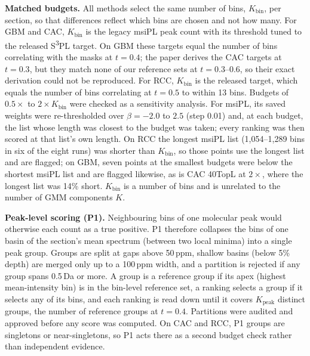 \textbf{Matched budgets.} All methods select the same number of bins,
$K_{\text{bin}}$, per section, so that differences reflect which bins are
chosen and not how many. For GBM and CAC, $K_{\text{bin}}$ is the legacy msiPL peak count with its
threshold tuned to the released S\textsuperscript{3}PL target. On GBM these
targets equal the number of bins correlating with the masks at $t=0.4$; the
paper derives the CAC targets at $t=0.3$, but they match none of our reference
sets at $t=0.3$--$0.6$, so their exact derivation could not be reproduced.
For RCC, $K_{\text{bin}}$ is the released target, which equals the number of
bins correlating at $t=0.5$ to within 13 bins. Budgets of $0.5\times$ to $2\times K_{\text{bin}}$ were checked as a
sensitivity analysis. For msiPL, its saved weights were re-thresholded over
$\beta=-2.0$ to $2.5$ (step 0.01) and, at each budget, the list whose length was
closest to the budget was taken; every ranking was then scored at that list's
own length. On RCC the longest msiPL list (1{,}054--1{,}289 bins in six of the
eight runs) was shorter than $K_{\text{bin}}$, so those points use the longest
list and are flagged; on GBM, seven points at the smallest budgets were below
the shortest msiPL list and are flagged likewise, as is CAC 40TopL at $2\times$, where the longest
list was 14\% short. $K_{\text{bin}}$ is a number
of bins and is unrelated to the number of GMM components $K$.

\textbf{Peak-level scoring (P1).} Neighbouring bins of one molecular peak would
otherwise each count as a true positive. P1 therefore collapses the bins of
one basin of the section's mean spectrum (between two local minima) into a
single peak group. Groups are split at gaps above 50\,ppm, shallow basins
(below 5\% depth) are merged only up to a 100\,ppm width, and a partition is
rejected if any group spans 0.5\,Da or more. A group is a reference group if
its apex (highest mean-intensity bin) is in the bin-level reference set, a
ranking selects a group if it selects any of its bins, and each ranking is
read down until it covers $K_{\text{peak}}$ distinct groups, the number of
reference groups at $t=0.4$. Partitions were audited and approved before any
score was computed. On CAC and
RCC, P1 groups are singletons or near-singletons, so P1 acts there as a second
budget check rather than independent evidence.


